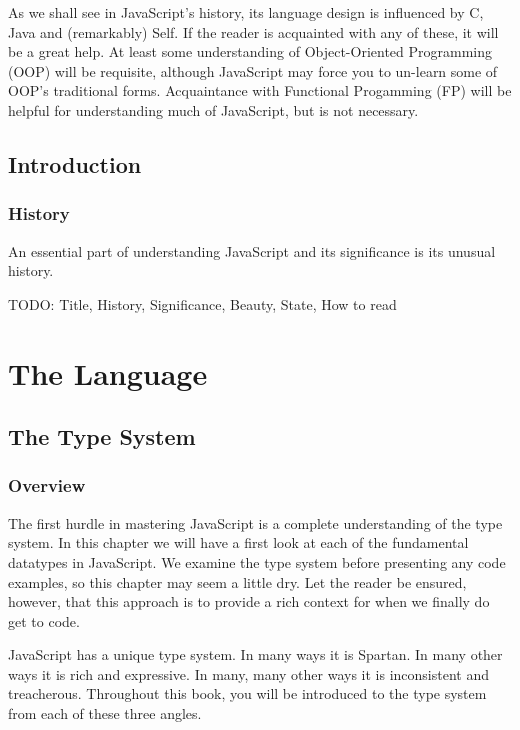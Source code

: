\documentclass[11pt,letter]{book}
\begin{document}
    As we shall see in JavaScript's history, its language design is influenced by C, Java and 
    (remarkably) Self. If the reader is acquainted with any of these, it will be a great help. At 
    least some understanding of Object-Oriented Programming (OOP) will be requisite, although 
    JavaScript may force you to un-learn some of OOP's traditional forms. Acquaintance with 
    Functional Progamming (FP) will be helpful for understanding much of JavaScript, but is not 
    necessary.
    
    \chapter{Introduction}
    
    \section*{History}
    An essential part of understanding JavaScript and its significance is its unusual history.
    
    
    
    
    
    
    
    
    
    
    
    TODO: Title, History, Significance, Beauty, State, How to read
    
    \mainmatter
    
    \part{The Language}
    \chapter{The Type System}
    
    \section{Overview}
    The first hurdle in mastering JavaScript is a complete understanding of the type system. In this 
    chapter we will have a first look at each of the fundamental datatypes in JavaScript. We examine 
    the type system before presenting any code examples, so this chapter may seem a little dry. Let 
    the reader be ensured, however, that this approach is to provide a rich context for when we 
    finally do get to code.
    
    JavaScript has a unique type system. In many ways it is Spartan. In many other ways 
    it is rich and expressive. In many, many other ways it is inconsistent and treacherous.
    Throughout this book, you will be introduced to the type system from each of these three 
    angles.
    
\end{document}

